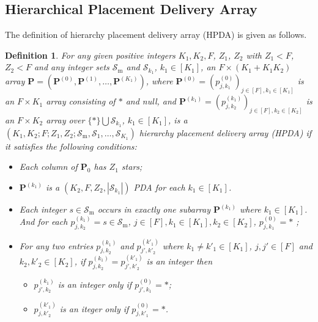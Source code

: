 \documentclass[onecolumn,10pt]{IEEEtran}
\theoremstyle{mythm}
\newtheorem{definition}{Definition}
\begin{document}
\subsection{Hierarchical Placement Delivery Array}
The definition of hierarchy placement delivery array (HPDA) is given as follows.
\label{subsec:HPDA}
\begin{definition}\label{def-H-PDA}
For any given positive integers $K_{1}, K_{2}, F$, $Z_{1}$, $Z_{2}$ with $Z_1<F$, $Z_2<F$ and any integer sets $\mathcal{S}_\text{m}$ and $\mathcal{S}_{k_1}$, $k_1\in[K_1]$, an $F\times (K_1+K_1K_2)$ array $\mathbf{P}=(\mathbf{P}^{(0)},\mathbf{P}^{(1)},\ldots,\mathbf{P}^{(K_1)})$,
where $\mathbf{P}^{(0)}=(p^{(0)}_{j,k_1})_{j\in[F],k_1\in [K_1]}$ is an $F\times K_1$ array consisting of $*$ and null, and $\mathbf{P}^{(k_1)}=(p^{(k_1)}_{j,k_2})_{j\in[F],k_2\in [K_2]}$ is an $F\times K_2$ array over $\{*\}\bigcup \mathcal{S}_{k_1}$,  $k_1\in[K_1]$, is a $(K_1,K_2;F;Z_1,Z_2;\mathcal{S}_\text{m},\mathcal{S}_1,\ldots,\mathcal{S}_{K_1})$ hierarchy placement delivery array (HPDA) if it satisfies the following conditions:
\begin{itemize}
\item[B1.] Each column of $\mathbf{P}_0$ has $Z_1$ stars;
\item[B2.] $\mathbf{P}^{(k_1)}$ is a $(K_2,F,Z_2,|\mathcal{S}_{k_1}|)$ PDA for each $k_1\in [K_1]$.
\item[B3.] Each integer $s\in \mathcal{S}_\text{m}$ occurs in exactly one subarray $\mathbf{P}^{(k_1)}$ where $k_1\in[K_1]$. And for each $p^{(k_1)}_{j,k_2}=s\in \mathcal{S}_\text{m}$, $j\in[F],k_1\in[K_1],k_2\in[K_2]$, $p^{(0)}_{j,k_1}=*$ ;
\item[B4.] For any two entries $p^{(k_1)}_{j,k_2}$ and $p^{(k'_1)}_{j',k'_2}$ where $k_1\neq k'_1\in[K_1]$, $j,j'\in [F]$ and $k_2,k'_2\in[K_2]$, if $p^{(k_1)}_{j,k_2}=p^{(k'_1)}_{j',k'_2}$ is an integer then
\begin{itemize}
\item $p^{(k_1)}_{j',k_2}$ is an integer only if $p^{(0)}_{j',k_1}=*$;
\item $p^{(k'_1)}_{j,k'_2}$ is an iteger only if $p^{(0)}_{j,k'_1}=*$.
\end{itemize}
\end{itemize}
\end{definition}
\end{document}
